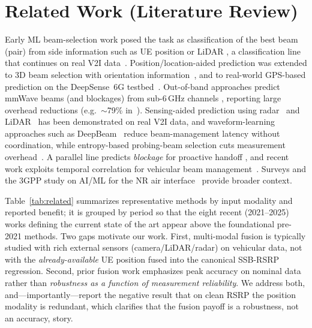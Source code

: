 \documentclass[conference]{IEEEtran}
\begin{document}
\section{Related Work (Literature Review)}\label{sec:related}
Early ML beam-selection work posed the task as classification of the best beam
(pair) from side information such as UE position or LiDAR
\cite{heng2019mlbeam,klautau2018itadata,klautau2019lidar}, a classification line
that continues on real V2I data~\cite{biliaminu2024v2i}. Position/location-aided
prediction was extended to 3D beam selection with orientation
information~\cite{rezaie2022location}, and to real-world GPS-based prediction on
the DeepSense~6G testbed~\cite{alkhateeb2023deepsense}. Out-of-band approaches
predict mmWave beams (and blockages) from sub-6\,GHz channels
\cite{sim2020sub6,alrabeiah2020sub6blockage,deng2025scanbest}, reporting large
overhead reductions (e.g.\ $\sim$79\% in~\cite{sim2020sub6}). Sensing-aided
prediction using radar~\cite{demirhan2022radar} and LiDAR~\cite{jiang2023lidar}
has been demonstrated on real V2I data, and waveform-learning approaches such as
DeepBeam~\cite{polese2021deepbeam} reduce beam-management latency without
coordination, while entropy-based probing-beam selection cuts measurement
overhead~\cite{meng2024entropy}. A parallel line predicts \emph{blockage} for proactive handoff
\cite{alkhateeb2018blockage,wu2022blockage}, and recent work exploits temporal
correlation for vehicular beam management~\cite{oliveira2025temporal}. Surveys
\cite{xue2024survey} and the 3GPP study on AI/ML for the NR air
interface~\cite{tr38843} provide broader context.

Table~\ref{tab:related} summarizes representative methods by input modality and
reported benefit; it is grouped by period so that the eight recent (2021--2025)
works defining the current state of the art appear above the foundational pre-2021
methods. Two gaps motivate our work. First, multi-modal fusion is
typically studied with rich external sensors (camera/LiDAR/radar) on vehicular
data, not with the \emph{already-available} UE position fused into the canonical
SSB-RSRP regression. Second, prior fusion work emphasizes peak accuracy on
nominal data rather than \emph{robustness as a function of measurement
reliability}. We address both, and---importantly---report the negative result
that on clean RSRP the position modality is redundant, which clarifies that the
fusion payoff is a robustness, not an accuracy, story.
\end{document}

